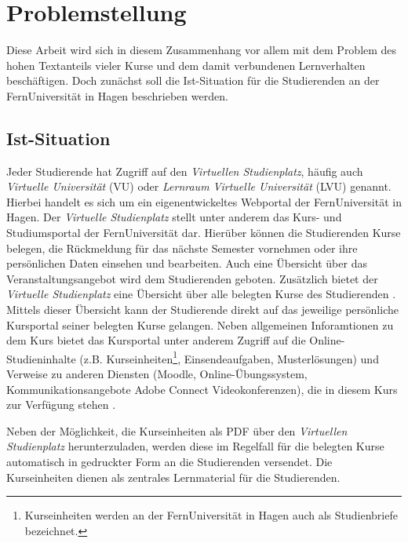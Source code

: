 \section{Problemstellung}
Diese Arbeit wird sich in diesem Zusammenhang vor allem mit dem Problem des hohen Textanteils vieler Kurse und dem damit verbundenen Lernverhalten beschäftigen. Doch zunächst soll die Ist-Situation für die Studierenden an der FernUniversität in Hagen beschrieben werden.

\subsection{Ist-Situation}
Jeder Studierende hat Zugriff auf den \textit{Virtuellen Studienplatz}, häufig auch \textit{Virtuelle Universität} (VU) oder \textit{Lernraum Virtuelle Universität} (LVU) genannt. Hierbei handelt es sich um ein eigenentwickeltes Webportal der FernUniversität in Hagen. Der \textit{Virtuelle Studienplatz} stellt unter anderem das Kurs- und Studiumsportal der FernUniversität dar. Hierüber können die Studierenden Kurse belegen, die Rückmeldung für das nächste Semester vornehmen oder ihre persönlichen Daten einsehen und bearbeiten. Auch eine Übersicht über das Veranstaltungsangebot wird dem Studierenden geboten. Zusätzlich bietet der \textit{Virtuelle Studienplatz} eine Übersicht über alle belegten Kurse des Studierenden \citep{fernuniversitaet2018vu}. Mittels dieser Übersicht kann der Studierende direkt auf das jeweilige persönliche Kursportal seiner belegten Kurse gelangen. Neben allgemeinen Inforamtionen zu dem Kurs bietet das Kursportal unter anderem Zugriff auf die Online-Studieninhalte (z.B. Kurseinheiten\footnote{Kurseinheiten werden an der FernUniversität in Hagen auch als Studienbriefe bezeichnet.}, Einsendeaufgaben, Musterlösungen) und Verweise zu anderen Diensten (Moodle, Online-Übungssystem, Kommunikationsangebote Adobe Connect Videokonferenzen), die in diesem Kurs zur Verfügung stehen \citep{fernuniversitaet2018kurs}.

Neben der Möglichkeit, die Kurseinheiten als PDF über den \textit{Virtuellen Studienplatz} herunterzuladen, werden diese im Regelfall für die belegten Kurse automatisch in gedruckter Form an die Studierenden versendet. Die Kurseinheiten dienen als zentrales Lernmaterial für die Studierenden.

